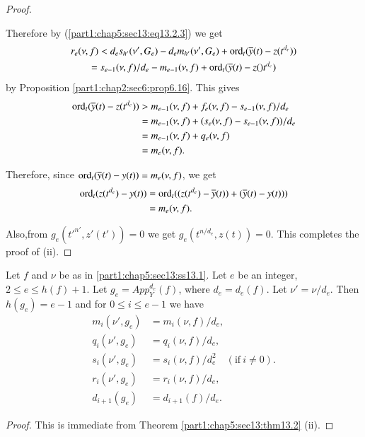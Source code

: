 \begin{proof}
\begin{enumerate}[(i)]
Therefore by (\ref{part1:chap5:sec13:eq13.2.3}) we get
\begin{gather*}
  r_e (\nu,f)< d_e s_{h'} (\nu' , G_e) - d_e m_{h'}(\nu', G_e) +
  \operatorname{ord}_t (\overline{y} (t)- z(t^{d_e}))\\
  = s_{e-1} (\nu, f)/d_e-m_{e-1} (\nu, f) + \operatorname{ord}_t (\overline{y}(t)- z()t^{d_e})
\end{gather*}
by Proposition \ref{part1:chap2:sec6:prop6.16}. This gives
\begin{align*}
  \operatorname{ord}_t (\overline{y}(t)- z(t^{d_e}))& > m_{e-1} (\nu, f) + f_e (\nu, f)-
  s_{e-1} (\nu, f)/d_e\\
  & = m_{e-1} (\nu, f) + (s_e (\nu, f)- s_{e-1} (\nu, f))/d_e\\
  & = m_{e-1} (\nu, f)+ q_e (\nu, f)\\
  & = m_e (\nu, f).
\end{align*}

Therefore, since $\operatorname{ord}_t(\overline{y} (t)- y(t))= m_e (\nu, f)$, we get
\begin{align*}
  \operatorname{ord}_t (z(t^{d_e})- y(t))& = \operatorname{ord}_t ((z(t^{d_e}) - \overline{y} (t)) +
  (\overline{y}(t)- y(t)))\\
  & = m_e (\nu, f).
\end{align*}
\end{enumerate}
Also,\pageoriginale from $g_e (t'^{n'}, z' (t'))=0$ we get $g_e (t^{n/d_e},
z(t))=0$. This completes the proof of (ii).
\end{proof}

\begin{coro}\label{part1:chap5:sec13:coro13.3}  
  Let $f$ and $\nu$ be as in \ref{part1:chap5:sec13:ss13.1}. Let $e$
  be an integer, $2 \leq e \leq h(f)+1$. Let $g_e = App_Y^{d_e} (f)$,
  where $d_e = d_e(f)$. Let $\nu' = \nu/d_e$. Then $h(g_e)=e-1$ and
  for $0 \leq i \leq e-1$ we have
\begin{align*}
  m_i (\nu', g_e)& = m_i (\nu, f)/d_e,\\
  q_i (\nu', g_e)& = q_i (\nu, f)/d_e,\\
  s_i (\nu', g_e) & = s_i (\nu, f)/d^2_e \quad (\text{if}~ i \neq
  0).\\
  r_i (\nu', g_e) & = r_i (\nu, f)/d_e,\\
  d_{i+1} (g_e) & = d_{i+1} (f)/ d_e.
\end{align*}
\end{coro}

\begin{proof}
  This is immediate from Theorem \ref{part1:chap5:sec13:thm13.2} (ii).
\end{proof}

